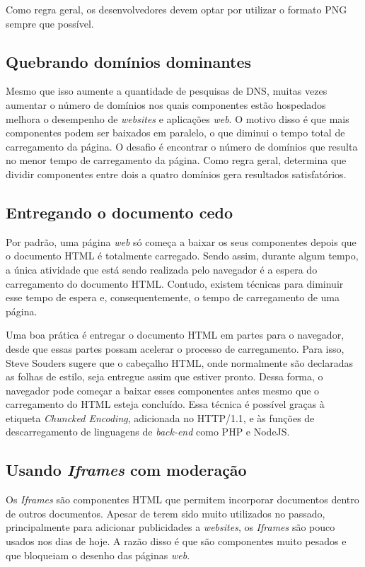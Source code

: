 Como regra geral, os desenvolvedores devem optar por utilizar o formato PNG sempre que possível.

\subsection{Quebrando domínios dominantes}
\label{subsec:evenfaster_cap11}
Mesmo que isso aumente a quantidade de pesquisas de DNS, muitas vezes aumentar o número de domínios nos quais componentes estão hospedados melhora o desempenho de \textit{websites} e aplicações \textit{web}. O motivo disso é que mais componentes podem ser baixados em paralelo, o que diminui o tempo total de carregamento da página. O desafio é encontrar o número de domínios que resulta no menor tempo de carregamento da página. Como regra geral,  determina que dividir componentes entre dois a quatro domínios gera resultados satisfatórios.

\subsection{Entregando o documento cedo}
\label{subsec:evenfaster_cap12}
Por padrão, uma página \textit{web} só começa a baixar os seus componentes depois que o documento HTML é totalmente carregado. Sendo assim, durante algum tempo, a única atividade que está sendo realizada pelo navegador é a espera do carregamento do documento HTML. Contudo, existem técnicas para diminuir esse tempo de espera e, consequentemente, o tempo de carregamento de uma página.

Uma boa prática é entregar o documento HTML em partes para o navegador, desde que essas partes possam acelerar o processo de carregamento. Para isso, Steve Souders sugere que o cabeçalho HTML, onde normalmente são declaradas as folhas de estilo, seja entregue assim que estiver pronto. Dessa forma, o navegador pode começar a baixar esses componentes antes mesmo que o carregamento do HTML esteja concluído. Essa técnica é possível graças à etiqueta \textit{Chuncked Encoding}, adicionada no HTTP/1.1, e às funções de descarregamento de linguagens de \textit{back-end} como PHP e NodeJS.

\subsection{Usando \textit{Iframes} com moderação}
\label{subsec:evenfaster_cap13}
Os \textit{Iframes} são componentes HTML que permitem incorporar documentos dentro de outros documentos. Apesar de terem sido muito utilizados no passado, principalmente para adicionar publicidades a \textit{websites}, os \textit{Iframes} são pouco usados nos dias de hoje. A razão disso é que são componentes muito pesados e que bloqueiam o desenho das páginas \textit{web}.

